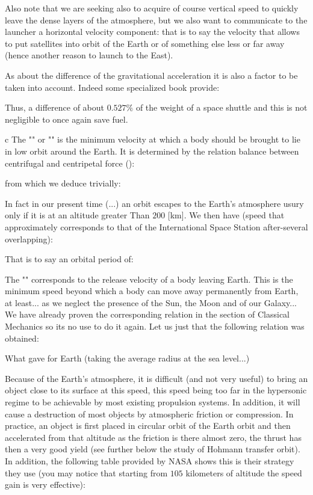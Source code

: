 	Also note that we are seeking also to acquire of course vertical speed to quickly leave the dense layers of the atmosphere, but we also want to communicate to the launcher a horizontal velocity component: that is to say the velocity that allows to put satellites into orbit of the Earth or of something else less or far away (hence another reason to launch to the East).
	
	As about the difference of the gravitational acceleration it is also a factor to be taken into account. Indeed some specialized book provide:
	
	Thus, a difference of about $0.527\%$ of the weight of a space shuttle and this is not negligible to once again save fuel.
	
	c
	The "" or "" is the minimum velocity at which a body should be brought to lie in low orbit around the Earth. It is determined by the relation balance between centrifugal and centripetal force ():
	
	from which we deduce trivially:
	
	In fact in our present time (...) an orbit escapes to the Earth's atmosphere usury only if it is at an altitude greater Than $200$ [km]. We then have (speed that approximately corresponds to that of the International Space Station after-several overlapping):
	
	That is to say an orbital period of:
	
	
	The "" corresponds to the release velocity of a body leaving Earth. This is the minimum speed beyond which a body can move away permanently from Earth, at least... as we neglect the presence of the Sun, the Moon and of our Galaxy... We have already proven the corresponding relation in the section of Classical Mechanics so its no use to do it again. Let us just that the following relation was obtained:
	
	What gave for Earth (taking the average radius at the sea level...)
	
	
	Because of the Earth's atmosphere, it is difficult (and not very useful) to bring an object close to its surface at this speed, this speed being too far in the hypersonic regime to be achievable by most existing propulsion systems. In addition, it will cause a destruction of most objects by atmospheric friction or compression. In practice, an object is first placed in circular orbit of the Earth orbit and then accelerated from that altitude as the friction is there almost zero, the thrust has then a very good yield (see further below the study of Hohmann transfer orbit). In addition, the following table provided by NASA shows this is their strategy they use (you may notice that starting from $105$ kilometers of altitude the speed gain is very effective):
		

